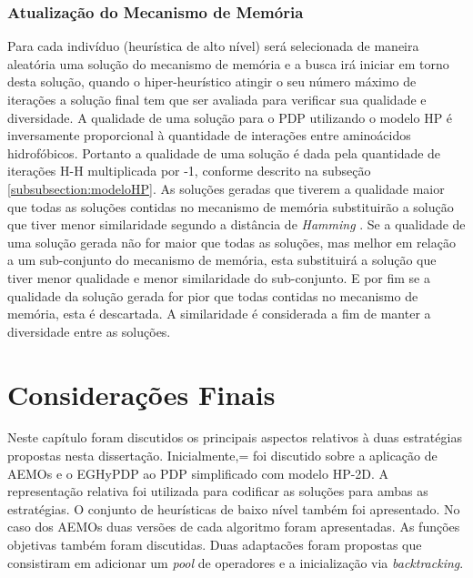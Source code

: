 


\subsubsection{Atualização do Mecanismo de Memória}
Para cada indivíduo (heurística de alto nível) será selecionada de maneira aleatória uma solução do mecanismo de memória e a busca irá iniciar em torno desta solução, quando o  hiper-heurístico atingir o seu número máximo de iterações a solução final tem que ser avaliada para verificar sua qualidade e diversidade. A qualidade de uma solução para o PDP utilizando o modelo HP é inversamente proporcional à quantidade de interações entre aminoácidos hidrofóbicos. Portanto a qualidade de uma solução é dada pela quantidade de iterações H-H multiplicada por -1, conforme descrito na subseção \ref{subsubsection:modeloHP}.  As soluções geradas que tiverem a qualidade maior que todas as soluções contidas no mecanismo de memória substituirão a solução que tiver menor similaridade segundo a distância de \textit{Hamming} \cite{hamming1950error}. Se a qualidade de uma solução gerada não for maior que todas as soluções, mas melhor em relação a um sub-conjunto do mecanismo de memória, esta substituirá a solução que tiver menor qualidade e menor similaridade do sub-conjunto. E por fim se a qualidade da solução gerada for pior que todas contidas no mecanismo de memória, esta é descartada. A similaridade é considerada a fim de manter a diversidade entre as soluções.  



\section{Considerações Finais}
\label{Metodologia:ConsideracoesFinais}

Neste capítulo foram discutidos os principais aspectos relativos à duas estratégias propostas nesta dissertação. Inicialmente,= foi discutido sobre a aplicação de AEMOs e o EGHyPDP ao PDP simplificado com modelo HP-2D. A representação relativa foi utilizada para codificar as soluções para ambas as estratégias. O conjunto de heurísticas de baixo nível também foi apresentado. No caso dos AEMOs duas versões de cada algoritmo foram apresentadas. As funções objetivas também foram discutidas. Duas adaptacões foram propostas que consistiram em adicionar um \textit{pool} de operadores e a inicialização via \textit{backtracking}.



